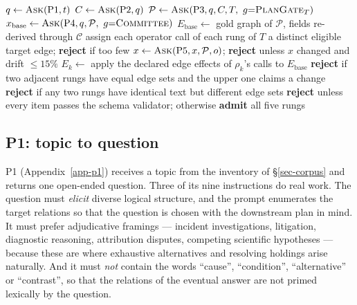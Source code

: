 \begin{algorithm}[t]
\caption{Generating one family of type $T$ on topic $t$. \textsc{Ask}$(P,\cdot,g)$ calls prompt $P$, parses
  the output, applies check $g$, and on a parse or check failure re-issues the prompt with the failure
  reason appended (Appendix~\ref{app-retry}), up to $3$ attempts at temperatures $(\text{default},0.3,0.7)$.}
\label{alg:pipeline}
\begin{algorithmic}[1]
\State $q \gets \textsc{Ask}(\text{P1}, t)$ 
\State $C \gets \textsc{Ask}(\text{P2}, q)$ 
\State $\mathcal{P} \gets \textsc{Ask}(\text{P3}, q, C, T,\ g{=}\textsc{PlanGate}_T)$ 
\State $x_{\text{base}} \gets \textsc{Ask}(\text{P4}, q, \mathcal{P},\ g{=}\textsc{Committee})$ 
\State $E_{\text{base}} \gets$ gold graph of $\mathcal{P}$, fields re-derived through $\mathcal{C}$
\State assign each operator call of each rung of $T$ a distinct eligible target edge; \textbf{reject} if too few
    \State $x \gets \textsc{Ask}(\text{P5}, x, \mathcal{P}, o)$; \textbf{reject} unless $x$ changed and drift $\le 15\%$
  \EndFor
  \State $E_k \gets$ apply the declared edge effects of $\rho_k$'s calls to $E_{\text{base}}$
\EndFor
\State \textbf{reject} if two adjacent rungs have equal edge sets and the upper one claims a change
\State \textbf{reject} if any two rungs have identical text but different edge sets
\State \textbf{reject} unless every item passes the schema validator; otherwise \textbf{admit} all five rungs
\end{algorithmic}
\end{algorithm}

\subsection{P1: topic to question}
\label{sec-p1}

P1 (Appendix~\ref{app-p1}) receives a topic from the inventory of \S\ref{sec-corpus} and returns one open-ended
question. Three of its nine instructions do real work. The question must \emph{elicit} diverse logical structure,
and the prompt enumerates the target relations so that the question is chosen with the downstream plan in mind. It
must prefer adjudicative framings --- incident investigations, litigation, diagnostic reasoning, attribution
disputes, competing scientific hypotheses --- because these are where exhaustive alternatives and resolving
holdings arise naturally. And it must \emph{not} contain the words ``cause'', ``condition'', ``alternative'' or
``contrast'', so that the relations of the eventual answer are not primed lexically by the question.

